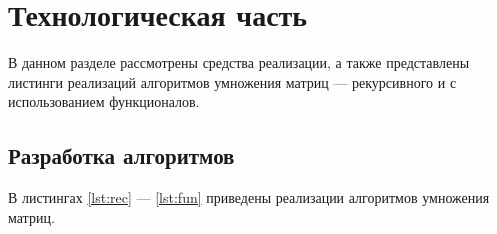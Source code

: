 \chapter{Технологическая часть}
В данном разделе рассмотрены средства реализации, а также представлены листинги реализаций алгоритмов умножения матриц --- рекурсивного и с использованием функционалов.

\section{Разработка алгоритмов}
В листингах \ref{lst:rec} --- \ref{lst:fun} приведены реализации алгоритмов умножения матриц.

\clearpage
{}
\clearpage

